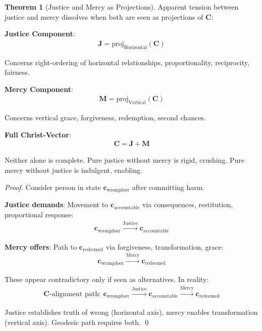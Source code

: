 \documentclass[11pt,a4paper]{article}
\theoremstyle{definition}
\newtheorem{theorem}{Theorem}[section]
\theoremstyle{remark}
\newcommand{\cc}{\mathbf{c}}
\begin{document}
\begin{enumerate}
\begin{theorem}[Justice and Mercy as Projections]
Apparent tension between justice and mercy dissolves when both are seen as projections of \(\mathbf{C}\):

\textbf{Justice Component}:
\begin{align}
\mathbf{J} = \text{proj}_{\text{Horizontal}}(\mathbf{C})
\end{align}

Concerns right-ordering of horizontal relationships, proportionality, reciprocity, fairness.

\textbf{Mercy Component}:
\begin{align}
\mathbf{M} = \text{proj}_{\text{Vertical}}(\mathbf{C})
\end{align}

Concerns vertical grace, forgiveness, redemption, second chances.

\textbf{Full Christ-Vector}:
\begin{align}
\mathbf{C} = \mathbf{J} + \mathbf{M}
\end{align}

Neither alone is complete. Pure justice without mercy is rigid, crushing. Pure mercy without justice is indulgent, enabling.
\end{theorem}

\begin{proof}
Consider person in state \(\cc_{\text{wrongdoer}}\) after committing harm.

\textbf{Justice demands}: Movement to \(\cc_{\text{accountable}}\) via consequences, restitution, proportional response:
\begin{align}
\cc_{\text{wrongdoer}} \xrightarrow{\text{Justice}} \cc_{\text{accountable}}
\end{align}

\textbf{Mercy offers}: Path to \(\cc_{\text{redeemed}}\) via forgiveness, transformation, grace:
\begin{align}
\cc_{\text{wrongdoer}} \xrightarrow{\text{Mercy}} \cc_{\text{redeemed}}
\end{align}

These appear contradictory only if seen as alternatives. In reality:
\begin{align}
\mathbf{C}\text{-alignment path: } \cc_{\text{wrongdoer}} \xrightarrow{\text{Justice}} \cc_{\text{accountable}} \xrightarrow{\text{Mercy}} \cc_{\text{redeemed}}
\end{align}

Justice establishes truth of wrong (horizontal axis), mercy enables transformation (vertical axis). Geodesic path requires both. \qed
\end{proof}


\end{enumerate}
\end{document}
